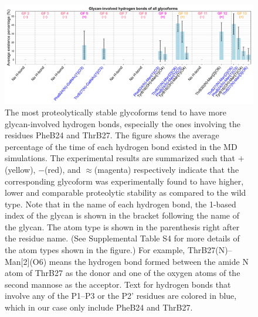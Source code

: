 \documentclass[9pt]{elife}
\begin{document}
\begin{figure}[H]
\centering
\includegraphics[width=\textwidth]{Figures/hbond_results.png}
\caption{The most proteolytically stable glycoforms tend to have more glycan-involved hydrogen bonds, especially the ones involving the residues PheB24 and ThrB27. The figure shows the average percentage of the time of each hydrogen bond existed in the MD simulations. The experimental results are summarized such that $+$(yellow), $-$(red), and $\approx$(magenta) respectively indicate that the corresponding glycoform was experimentally found to have higher, lower and comparable proteolytic stability as compared to the wild type. Note that in the name of each hydrogen bond, the 1-based index of the glycan is shown in the bracket following the name of the glycan. The atom type is shown in the parenthesis right after the residue name. (See Supplemental Table S4 for more details of the atom types shown in the figure.) For example, ThrB27(N)--Man[2](O6) means the hydrogen bond formed between the amide N atom of ThrB27 as the donor and one of the oxygen atoms of the second mannose as the acceptor. Text for hydrogen bonds that involve any of the P1--P3 or the P2' residues are colored in blue, which in our case only include PheB24 and ThrB27.}
\label{result_hbond}
\end{figure}
\end{document}

